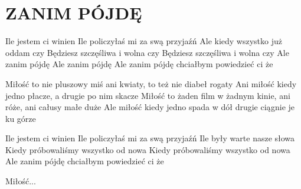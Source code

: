 \documentclass[../../../songbook.tex]{subfiles}
\begin{document}
\TabPositions{8cm} %
\section*{ZANIM PÓJDĘ}
\vspace{0.5cm}

Ile jestem ci winien				    \newline
Ile policzyłaś mi za swą przyjaźń			\newline
Ale kiedy wszystko już oddam czy 			\newline
Będziesz szczęśliwa i wolna czy 			\newline
Będziesz szczęśliwa i wolna czy 			\newline
Ale zanim pójdę 					        \newline
Ale zanim pójdę 					        \newline
Ale zanim pójdę chciałbym powiedzieć ci że	\newline	  

\-\hspace{1cm} Miłość to nie pluszowy miś		\newline
\-\hspace{1cm} ani kwiaty, to też nie diabeł rogaty \newline
\-\hspace{1cm} Ani miłość kiedy jedno płacze,		\newline
\-\hspace{1cm} a drugie po nim skacze				\newline
\-\hspace{1cm} Miłość to żaden film w żadnym kinie, \newline
\-\hspace{1cm} ani róże, ani całusy małe duże 		\newline
\-\hspace{1cm} Ale miłość kiedy jedno spada w dół   \newline
\-\hspace{1cm} drugie ciągnie je ku górze  			\newline      

Ile jestem ci winien                        \newline
Ile policzyłaś mi za swą przyjaźń           \newline
Ile były warte nasze słowa                  \newline
Kiedy próbowaliśmy wszystko od nowa         \newline
Kiedy próbowaliśmy wszystko od nowa         \newline
Ale zanim pójdę chciałbym powiedzieć ci że  \newline

\-\hspace{1cm} Miłość...
\end{document}
